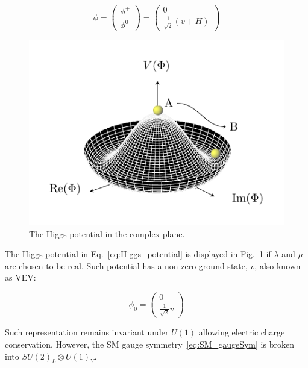			\begin{equation}
			\label{eq:Higgs_doublet}
				\phi = 
				\begin{pmatrix}
					\phi^+ \\ \phi^0
				\end{pmatrix} 
				=
				\begin{pmatrix}
					0 \\ \frac{1}{\sqrt{2}} \left ( v + H \right )
				\end{pmatrix}
			\end{equation}

			\begin{figure}
					\centering
					\includegraphics[width=.4\textwidth]{HiggsPotential/HiggsPotential}
				\caption{\label{fig:higgs_potential}The Higgs potential in the complex plane.} %
			\end{figure}

			The Higgs potential in Eq.~\ref{eq:Higgs_potential} is displayed in Fig.~\ref{fig:higgs_potential} if $\lambda$ and $\mu$ are chosen to be real. Such potential has a non-zero ground state, $v$, also known as \ac{VEV}:

			\begin{equation}
			\label{eq:Higgs_vev}
				\phi_0 = 
				\begin{pmatrix}
					0 \\ \frac{1}{\sqrt{2}} v
				\end{pmatrix}
			\end{equation}

			\noindent Such representation remains invariant under $U(1)$ allowing electric charge conservation. However, the \ac{SM} gauge symmetry~\ref{eq:SM_gaugeSym} is broken into $SU(2)_L \otimes U(1)_Y$.

